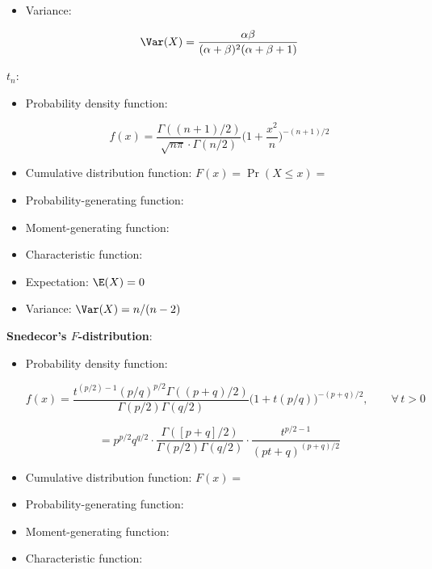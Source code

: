 \begin{itemize}
\begin{itemize}
\item Variance: 

\[
\Var(X) = \frac{\alpha \beta}{(\alpha + \beta)^2(\alpha + \beta + 1)} 
\]

\end{itemize}

\textbf{\(t_n\)}:

\begin{itemize}

\item Probability density function: 

\[
f(x)  = \frac{\Gamma((n+1)/2)}{\sqrt{n \pi} \cdot \Gamma(n/2)} \bigg( 1 + \frac{x^2}{n} \bigg)^{-(n+1)/2}
\]

\item Cumulative distribution function: \(F(x) = \Pr(X \leq x) = \)

\item Probability-generating function: 

\item Moment-generating function:

\item Characteristic function:

\item Expectation: \(\E(X) = 0  \)

\item Variance: \(\Var(X) = n/(n-2)\)

\end{itemize}

\textbf{Snedecor's \(F\)-distribution}: 

\begin{itemize}

\item Probability density function: 

\[
f(x) =  \frac{t^{(p/2)-1}(p/q)^{p/2}\Gamma((p+q)/2)}{\Gamma(p/2)\Gamma(q/2)}\Big(1+t(p/q)\Big)^{-(p+q)/2},\qquad\forall\,t>0
\]

\[
= p^{p/2} q^{q/2}  \cdot  \frac{\Gamma([p+q]/2)  }{\Gamma(p/2)\Gamma(q/2) } \cdot  \frac{t^{p/2-1} }{  (pt+q)^{(p+q)/2} }
\]

\item Cumulative distribution function: \(F(x) =\)

\item Probability-generating function:

\item Moment-generating function:

\item Characteristic function:


\end{itemize}
\end{itemize}
